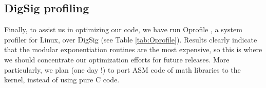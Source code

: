 \documentclass{article}
\begin{document}




\subsection{DigSig profiling}

Finally, to assist us in optimizing our code, we have run Oprofile
\cite{OProfile}, a system profiler for Linux, over DigSig (see Table \ref{tab:Oprofile}). 
Results
clearly indicate that the modular exponentiation routines are the most
expensive, so this is where we should concentrate our optimization
efforts for future releases. More particularly, we plan (one day !) to port ASM
code of math libraries to the kernel, instead of using pure C code.
\end{document}
